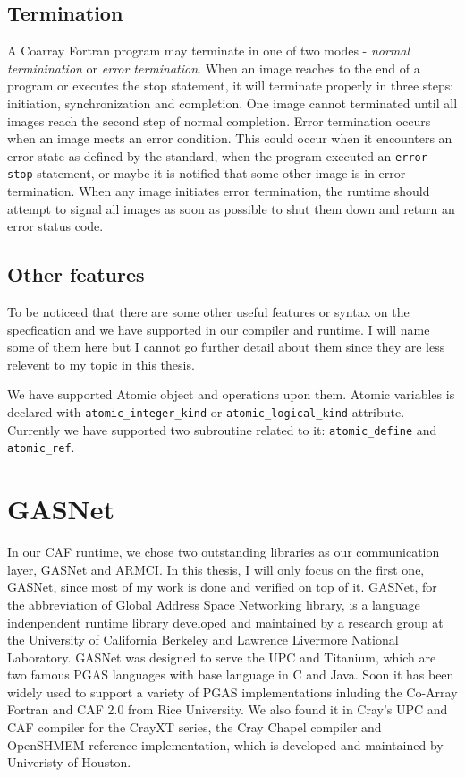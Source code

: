 \subsection{Termination}
A Coarray Fortran program may terminate in one of two modes - \emph{normal terminination} or \emph{error termination}. When an image reaches to the end of a program or executes the stop statement, it will terminate properly in three steps: initiation, synchronization and completion. One image cannot terminated until all images reach the second step of normal completion. Error termination occurs when an image meets an error condition. This could occur when it encounters an error state as defined by the standard, when the program executed an \texttt{error stop} statement, or maybe it is notified that some other image is in error termination. When any image initiates error termination, the runtime should attempt to signal all images as soon as possible to shut them down and return an error status code.
\subsection{Other features}
To be noticeed that there are some other useful features or syntax on the specfication and we have supported in our compiler and runtime. I will name some of them here but I cannot go further detail about them since they are less relevent to my topic in this thesis. 

We have supported Atomic object and operations upon them. Atomic variables is declared with \texttt{atomic\_integer\_kind} or \texttt{atomic\_logical\_kind} attribute. Currently we have supported two subroutine related to it: \texttt{atomic\_define} and \texttt{atomic\_ref}. 

\section{GASNet}
In our CAF runtime, we chose two outstanding libraries as our communication layer, GASNet and ARMCI. In this thesis, I will only focus on the first one, GASNet, since most of my work is done and verified on top of it. GASNet\cite{bonachea2002gasnet}\cite{bonachea2002gasnetspec}, for the abbreviation of Global Address Space Networking library, is a language indenpendent runtime library developed and maintained by a research group at the University of California Berkeley and Lawrence Livermore National Laboratory. GASNet was designed to serve the UPC and Titanium, which are two famous PGAS languages with base language in C and Java. Soon it has been widely used to support a variety of PGAS implementations inluding the Co-Array Fortran and CAF 2.0 from Rice University. We also found it in Cray's UPC and CAF compiler for the CrayXT series, the Cray Chapel compiler and OpenSHMEM reference implementation, which is developed and maintained by Univeristy of Houston. 

